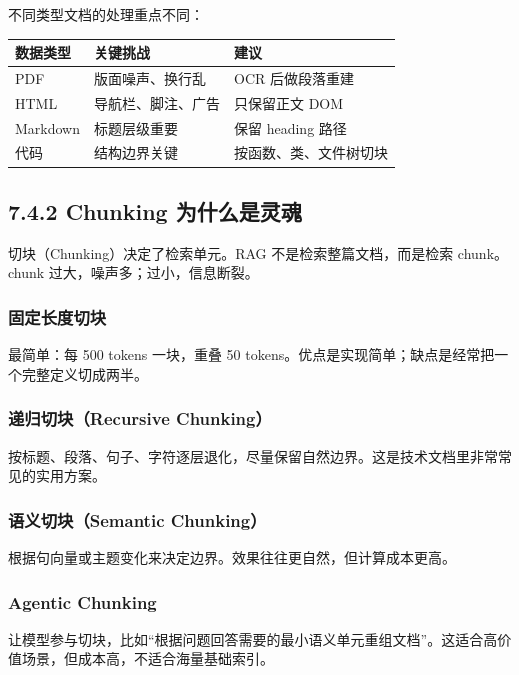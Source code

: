 不同类型文档的处理重点不同：


\begingroup
\scriptsize
\setlength{\tabcolsep}{3pt}
\begin{longtable}{|p{}|p{}|p{}|}
\hline
数据类型 & 关键挑战 & 建议 \\ \hline
PDF & 版面噪声、换行乱 & OCR 后做段落重建 \\ \hline
HTML & 导航栏、脚注、广告 & 只保留正文 DOM \\ \hline
Markdown & 标题层级重要 & 保留 heading 路径 \\ \hline
代码 & 结构边界关键 & 按函数、类、文件树切块 \\ \hline
\end{longtable}
\endgroup

\subsection{7.4.2 Chunking 为什么是灵魂}

切块（Chunking）决定了检索单元。RAG 不是检索整篇文档，而是检索 chunk。chunk 过大，噪声多；过小，信息断裂。


\subsubsection{固定长度切块}

最简单：每 500 tokens 一块，重叠 50 tokens。优点是实现简单；缺点是经常把一个完整定义切成两半。


\subsubsection{递归切块（Recursive Chunking）}

按标题、段落、句子、字符逐层退化，尽量保留自然边界。这是技术文档里非常常见的实用方案。


\subsubsection{语义切块（Semantic Chunking）}

根据句向量或主题变化来决定边界。效果往往更自然，但计算成本更高。


\subsubsection{Agentic Chunking}

让模型参与切块，比如``根据问题回答需要的最小语义单元重组文档''。这适合高价值场景，但成本高，不适合海量基础索引。



